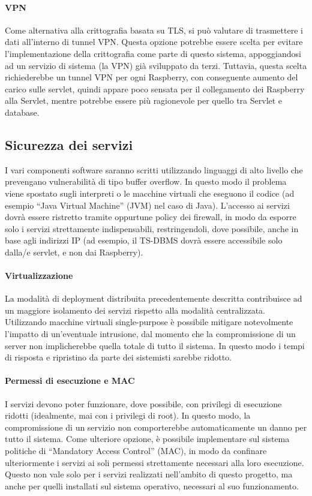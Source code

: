 \paragraph{VPN}
Come alternativa alla crittografia basata su TLS, si può valutare di trasmettere i dati all'interno di tunnel VPN. Questa opzione potrebbe essere scelta per evitare l'implementazione della crittografia come parte di questo sistema, appoggiandosi ad un servizio di sistema (la VPN) già sviluppato da terzi. Tuttavia, questa scelta richiederebbe un tunnel VPN per ogni Raspberry, con conseguente aumento del carico sulle servlet, quindi appare poco sensata per il collegamento dei Raspberry alla Servlet, mentre potrebbe essere più ragionevole per quello tra Servlet e database.

\subsection{Sicurezza dei servizi}
I vari componenti software saranno scritti utilizzando linguaggi di alto livello che prevengano vulnerabilità di tipo buffer overflow. In questo modo il problema viene spostato sugli interpreti o le macchine virtuali che eseguono il codice (ad esempio ``Java Virtual Machine'' (JVM) nel caso di Java). L'accesso ai servizi dovrà essere ristretto tramite oppurtune policy dei firewall, in modo da esporre solo i servizi strettamente indispensabili, restringendoli, dove possibile, anche in base agli indirizzi IP (ad esempio, il TS-DBMS dovrà essere accessibile solo dalla/e servlet, e non dai Raspberry).
\paragraph{Virtualizzazione}
La modalità di deployment distribuita precedentemente descritta contribuisce ad un maggiore isolamento dei servizi rispetto alla modalità centralizzata. Utilizzando macchine virtuali single-purpose è possibile mitigare notevolmente l'impatto di un'eventuale intrusione, dal momento che la compromissione di un server non implicherebbe quella totale di tutto il sistema. In questo modo i tempi di risposta e ripristino da parte dei sistemisti sarebbe ridotto.
\paragraph{Permessi di esecuzione e MAC}
I servizi devono poter funzionare, dove possibile, con privilegi di esecuzione ridotti (idealmente, mai con i privilegi di root). In questo modo, la compromissione di un servizio non comporterebbe automaticamente un danno per tutto il sistema. Come ulteriore opzione, è possibile implementare sul sistema politiche di ``Mandatory Access Control'' (MAC), in modo da confinare ulteriormente i servizi ai soli permessi strettamente necessari alla loro esecuzione. Questo non vale solo per i servizi realizzati nell'ambito di questo progetto, ma anche per quelli installati sul sistema operativo, necessari al suo funzionamento.